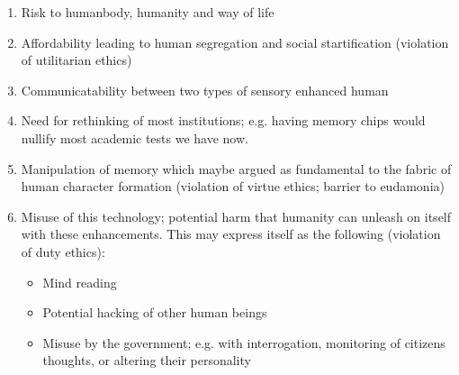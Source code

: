\begin{enumerate}
    \item Risk to humanbody, humanity and way of life
    \item Affordability leading to human segregation and social startification (violation of utilitarian ethics)
    \item Communicatability between two types of sensory enhanced human
    \item Need for rethinking of most institutions; e.g. having memory chips would nullify most academic tests we have now.
    \item Manipulation of memory which maybe argued as fundamental to the fabric of human character formation (violation of virtue ethics; barrier to eudamonia)
    \item Misuse of this technology; potential harm that humanity can unleash on itself with these enhancements. This may express itself as the following (violation of duty ethics):
        \begin{itemize}
            \item Mind reading
            \item Potential hacking of other human beings
            \item Misuse by the government; e.g. with interrogation, monitoring of citizens thoughts, or altering their personality
        \end{itemize}
\end{enumerate}
